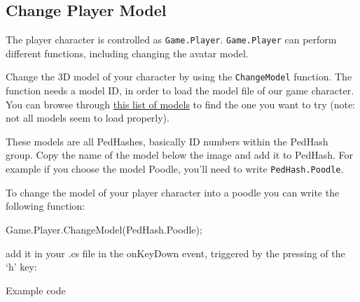 \documentclass[
  openany]{book}
\newenvironment{Shaded}{\begin{snugshade}}{\end{snugshade}}
\newcommand{\FunctionTok}[1]{\textcolor[rgb]{0.00,0.00,0.00}{#1}}
\newcommand{\NormalTok}[1]{#1}
\begin{document}
\hypertarget{change-player-model}{%
\subsection*{Change Player Model}\label{change-player-model}}

The player character is controlled as \texttt{Game.Player}. \texttt{Game.Player} can perform different functions, including changing the avatar model.

Change the 3D model of your character by using the \texttt{ChangeModel} function.
The function needs a model ID, in order to load the model file of our game character.
You can browse through \href{https://gtahash.ru/skins/}{this list of models} to find the one you want to try (note: not all models seem to load properly).

These models are all PedHashes, basically ID numbers within the PedHash group. Copy the name of the model below the image and add it to PedHash.
For example if you choose the model Poodle, you'll need to write \texttt{PedHash.Poodle}.

To change the model of your player character into a poodle you can write the following function:

\begin{Shaded}
\begin{Highlighting}[]
\NormalTok{Game.}\FunctionTok{Player}\NormalTok{.}\FunctionTok{ChangeModel}\NormalTok{(PedHash.}\FunctionTok{Poodle}\NormalTok{);}
\end{Highlighting}
\end{Shaded}

add it in your .cs file in the onKeyDown event, triggered by the pressing of the `h' key:

Example code
\end{document}

